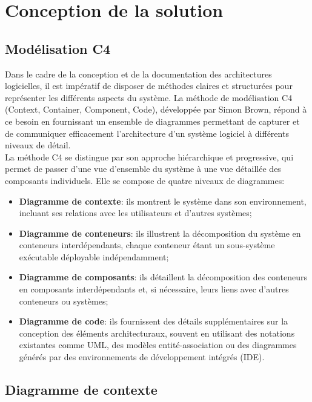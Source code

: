 \chapter{Conception de la solution}

\section{Modélisation C4}
Dans le cadre de la conception et de la documentation des architectures logicielles, il est impératif de disposer de méthodes claires et structurées pour représenter les différents aspects du système. La méthode de modélisation C4 (Context, Container, Component, Code), développée par Simon Brown, répond à ce besoin en fournissant un ensemble de diagrammes permettant de capturer et de communiquer efficacement l'architecture d'un système logiciel à différents niveaux de détail. \\

\noindent La méthode C4 se distingue par son approche hiérarchique et progressive, qui permet de passer d'une vue d'ensemble du système à une vue détaillée des composants individuels. Elle se compose de quatre niveaux de diagrammes: \\

\begin{itemize}
    \item \textbf{Diagramme de contexte}: ils montrent le système dans son environnement, incluant ses relations avec les utilisateurs et d'autres systèmes;
    \item \textbf{Diagramme de conteneurs}: ils illustrent la décomposition du système en conteneurs interdépendants, chaque conteneur étant un sous-système exécutable déployable indépendamment;
    \item \textbf{Diagramme de composants}: ils détaillent la décomposition des conteneurs en composants interdépendants et, si nécessaire, leurs liens avec d'autres conteneurs ou systèmes;
    \item \textbf{Diagramme de code}: ils fournissent des détails supplémentaires sur la conception des éléments architecturaux, souvent en utilisant des notations existantes comme UML, des modèles entité-association ou des diagrammes générés par des environnements de développement intégrés (IDE). \\
\end{itemize}

\clearpage

\section{Diagramme de contexte}

